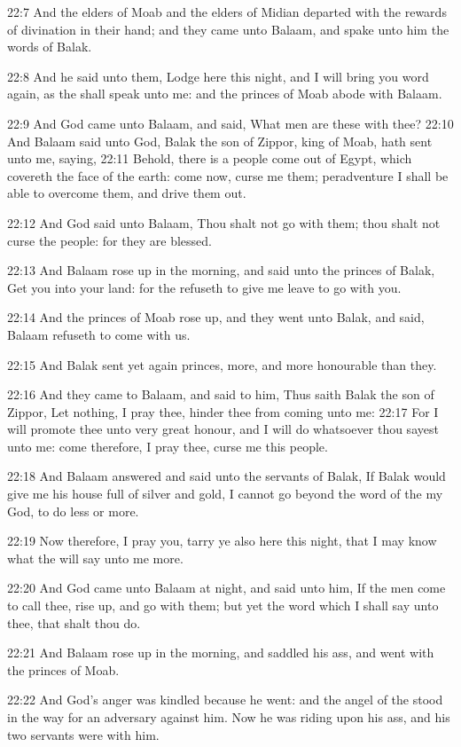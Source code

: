 22:7 And the elders of Moab and the elders of Midian departed with the rewards of divination in their hand; and they came unto Balaam, and spake unto him the words of Balak.

22:8 And he said unto them, Lodge here this night, and I will bring you word again, as the \LORD shall speak unto me: and the princes of Moab abode with Balaam.

22:9 And God came unto Balaam, and said, What men are these with thee?  22:10 And Balaam said unto God, Balak the son of Zippor, king of Moab, hath sent unto me, saying, 22:11 Behold, there is a people come out of Egypt, which covereth the face of the earth: come now, curse me them; peradventure I shall be able to overcome them, and drive them out.

22:12 And God said unto Balaam, Thou shalt not go with them; thou shalt not curse the people: for they are blessed.

22:13 And Balaam rose up in the morning, and said unto the princes of Balak, Get you into your land: for the \LORD refuseth to give me leave to go with you.

22:14 And the princes of Moab rose up, and they went unto Balak, and said, Balaam refuseth to come with us.

22:15 And Balak sent yet again princes, more, and more honourable than they.

22:16 And they came to Balaam, and said to him, Thus saith Balak the son of Zippor, Let nothing, I pray thee, hinder thee from coming unto me: 22:17 For I will promote thee unto very great honour, and I will do whatsoever thou sayest unto me: come therefore, I pray thee, curse me this people.

22:18 And Balaam answered and said unto the servants of Balak, If Balak would give me his house full of silver and gold, I cannot go beyond the word of the \LORD my God, to do less or more.

22:19 Now therefore, I pray you, tarry ye also here this night, that I may know what the \LORD will say unto me more.

22:20 And God came unto Balaam at night, and said unto him, If the men come to call thee, rise up, and go with them; but yet the word which I shall say unto thee, that shalt thou do.

22:21 And Balaam rose up in the morning, and saddled his ass, and went with the princes of Moab.

22:22 And God's anger was kindled because he went: and the angel of the \LORD stood in the way for an adversary against him. Now he was riding upon his ass, and his two servants were with him.

